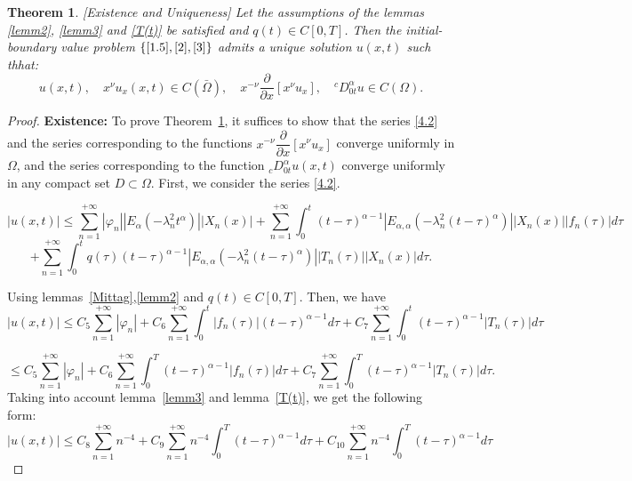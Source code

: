 \documentclass[reqno]{amsart}
\newtheorem{thm}{Theorem}[section]
\theoremstyle{definition}
\numberwithin{equation}{section}
\begin{document}
\begin{thm}\label{10.1}
[Existence and Uniqueness]
Let the assumptions of the lemmas \ref{lemm2}, \ref{lemm3} and \ref{T(t)} be satisfied and $q(t)\in C[0,T]$. 
Then the initial-boundary value problem $\{\eqref{1.5}, \ref{2}, \eqref{3}\}$ 
admits a unique solution $u(x,t)$ such thhat: 
\begin{equation*}
    u(x, t), \quad x^\nu u_x(x, t) \in C(\bar{\Omega}), \quad x^{-\nu}\frac{\partial}{\partial x}\left[x^\nu u_x\right],\quad ^cD_{0t}^\alpha u \in C(\Omega).
\end{equation*}
\end{thm}
\begin{proof}
\textbf{ Existence:} 
To prove Theorem~\ref{10.1}, it suffices to show that the series \eqref{4.2} and the series
corresponding to the functions $x^{-\nu}\dfrac{\partial}{\partial x}\left[x^{\nu}u_x\right]$ converge uniformly in $\Omega$, and the series corresponding to the function $_{c}D_{0t}^{\alpha}u(x,t)$ converge uniformly
in any compact set $D \subset\Omega$.
First, we consider the series \eqref{4.2}. 

\begin{equation*}
    |u(x,t)|\leq \sum_{n=1}^{+\infty}|\varphi_n|\left|E_{\alpha}(-\lambda_n^{2}t^{\alpha})\right|\left|X_n(x)\right|+\sum_{n=1}^{+\infty}\int_0^t(t-\tau)^{\alpha-1}\left|E_{\alpha,\alpha}(-\lambda_n^2(t-\tau)^{\alpha})\right||X_n(x)||f_n(\tau)|d\tau
\end{equation*}
\begin{equation*}
    +\sum_{n=1}^{+\infty}\int_0^tq(\tau)(t-\tau)^{\alpha-1}\left|E_{\alpha,\alpha}\left(-\lambda_n^2(t-\tau)^{\alpha}\right)\right|\left|T_n(\tau)\right||X_n(x)|d\tau.
\end{equation*}

Using  lemmas~\ref{Mittag},\ref{lemm2} and $q(t)\in C[0,T]$. Then, we have 
\begin{equation*}
    |u(x,t)|\leq C_{5}\sum_{n=1}^{+\infty}|\varphi_n|+C_{6}\sum_{n=1}^{+\infty}\int_0^t|f_n(\tau)|(t-\tau)^{\alpha-1}d\tau+
    C_{7}\sum_{n=1}^{+\infty}\int_0^t(t-\tau)^{\alpha-1}\left|T_n(\tau)\right|d\tau
\end{equation*}

\begin{equation*}
    \leq C_{5}\sum_{n=1}^{+\infty}|\varphi_n|+C_{6}\sum_{n=1}^{+\infty}\int_0^T(t-\tau)^{\alpha-1}|f_n(\tau)|d\tau+C_{7}\sum_{n=1}^{+\infty}\int_0^T(t-\tau)^{\alpha-1}\left|T_n(\tau)\right|d\tau.
\end{equation*}
Taking into account lemma~\ref{lemm3} and lemma~\ref{T(t)}, we get the following form:
\begin{equation*}
    |u(x,t)|\leq C_{8}\sum_{n=1}^{+\infty}n^{-4}+C_{9}\sum_{n=1}^{+\infty} n^{-4}\int_0^T(t-\tau)^{\alpha-1}d\tau +C_{10}\sum_{n=1}^{+\infty}n^{-4}\int_0^T(t-\tau)^{\alpha-1}d\tau
\end{equation*}




\end{proof}
\end{document}

